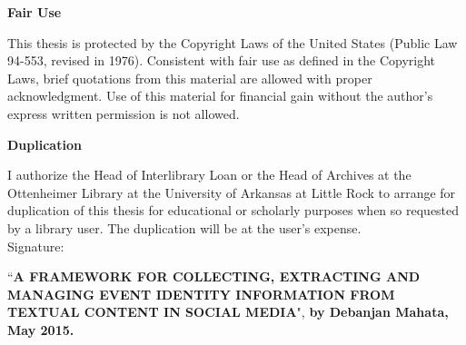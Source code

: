 \documentclass[12pt, oneside]{Thesis} %
\begin{document}
\clearpage

\begin{center}
\large \textbf{Fair Use}
\end{center}
This thesis is protected by the Copyright Laws of the United States (Public Law 94-553, revised in 1976). Consistent with fair use as defined in the Copyright Laws, brief quotations from this material are allowed with proper acknowledgment. Use of this material for financial gain without the author's express written permission is not allowed. \\[8cm]

\begin{center}
\large \textbf{Duplication}
\end{center}
I authorize the Head of Interlibrary Loan or the Head of Archives at the Ottenheimer Library at the University of Arkansas at Little Rock to arrange for duplication of this thesis for educational or scholarly purposes when so requested by a library user. The duplication will be at the user's expense. \\[2cm]

Signature: \hspace{1cm} \hrulefill

\clearpage

\large  ``\textbf{A FRAMEWORK FOR COLLECTING, EXTRACTING AND MANAGING EVENT IDENTITY INFORMATION FROM TEXTUAL CONTENT IN SOCIAL MEDIA}", \textbf{by Debanjan Mahata, May 2015.}

\doublespacing
{} %
\end{document}
